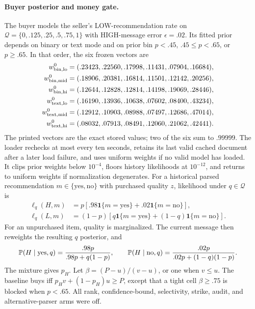 \paragraph{Buyer posterior and money gate.}
The buyer models the seller's LOW-recommendation rate on
$\mathcal Q=\{0,.125,.25,.5,.75,1\}$ with HIGH-message error $\epsilon=.02$.
Its fitted prior depends on binary or text mode and on prior bin
$p<.45$, $.45\leq p<.65$, or $p\geq.65$. In that order, the six frozen vectors
are
\begin{align*}
w^0_{\rm bin,lo}&=(.23423,.22560,.17998,.11431,.07904,.16684),\\
w^0_{\rm bin,mid}&=(.18906,.20381,.16814,.11501,.12142,.20256),\\
w^0_{\rm bin,hi}&=(.12644,.12828,.12814,.14198,.19069,.28446),\\
w^0_{\rm text,lo}&=(.16190,.13936,.10638,.07602,.08400,.43234),\\
w^0_{\rm text,mid}&=(.12912,.10903,.08988,.07497,.12686,.47014),\\
w^0_{\rm text,hi}&=(.08032,.07913,.08491,.12060,.21062,.42441).
\end{align*}
The printed vectors are the exact stored values; two of the six sum to
$.99999$. The loader rechecks at most every ten seconds, retains its last valid cached
document after a later load failure, and uses uniform weights if no valid model
has loaded. It clips prior weights below $10^{-4}$, floors history likelihoods
at $10^{-12}$, and returns to uniform weights if normalization degenerates.
For a historical parsed recommendation $m\in\{\mathrm{yes},\mathrm{no}\}$ with purchased
quality $z$, likelihood under $q\in\mathcal Q$ is
\begin{align*}
\ell_q(H,m)&=p[.98\mathbf1\{m=\mathrm{yes}\}+.02\mathbf1\{m=\mathrm{no}\}],\\
\ell_q(L,m)&=(1-p)[q\mathbf1\{m=\mathrm{yes}\}+(1-q)\mathbf1\{m=\mathrm{no}\}].
\end{align*}
For an unpurchased item, quality is marginalized. The current message then
reweights the resulting $q$ posterior, and
\[
\mathbb{P}(H\mid\mathrm{yes},q)=\frac{.98p}{.98p+q(1-p)},\qquad
\mathbb{P}(H\mid\mathrm{no},q)=\frac{.02p}{.02p+(1-q)(1-p)}.
\]
The mixture gives $p_H$. Let $\beta=(P-u)/(v-u)$, or one when $v\leq u$.
The baseline buys iff $p_Hv+(1-p_H)u\geq P$, except that a tight cell
$\beta\geq.75$ is blocked when $p<.65$. All rank, confidence-bound,
selectivity, strike, audit, and alternative-parser arms were off.

